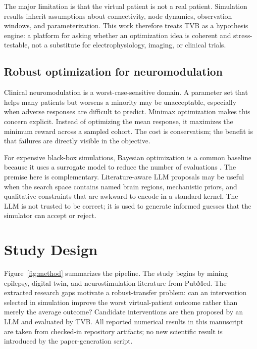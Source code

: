 \documentclass{article}
\begin{document}
The major limitation is that the virtual patient is not a real patient. Simulation results inherit assumptions about connectivity, node dynamics, observation windows, and parameterization. This work therefore treats TVB as a hypothesis engine: a platform for asking whether an optimization idea is coherent and stress-testable, not a substitute for electrophysiology, imaging, or clinical trials.

\subsection{Robust optimization for neuromodulation}
Clinical neuromodulation is a worst-case-sensitive domain. A parameter set that helps many patients but worsens a minority may be unacceptable, especially when adverse responses are difficult to predict. Minimax optimization makes this concern explicit. Instead of optimizing the mean response, it maximizes the minimum reward across a sampled cohort. The cost is conservatism; the benefit is that failures are directly visible in the objective.

For expensive black-box simulations, Bayesian optimization is a common baseline because it uses a surrogate model to reduce the number of evaluations \cite{snoek2012bayesopt}. The premise here is complementary. Literature-aware LLM proposals may be useful when the search space contains named brain regions, mechanistic priors, and qualitative constraints that are awkward to encode in a standard kernel. The LLM is not trusted to be correct; it is used to generate informed guesses that the simulator can accept or reject.

\section{Study Design}
Figure~\ref{fig:method} summarizes the pipeline. The study begins by mining epilepsy, digital-twin, and neurostimulation literature from PubMed. The extracted research gaps motivate a robust-transfer problem: can an intervention selected in simulation improve the worst virtual-patient outcome rather than merely the average outcome? Candidate interventions are then proposed by an LLM and evaluated by TVB. All reported numerical results in this manuscript are taken from checked-in repository artifacts; no new scientific result is introduced by the paper-generation script.
\end{document}
